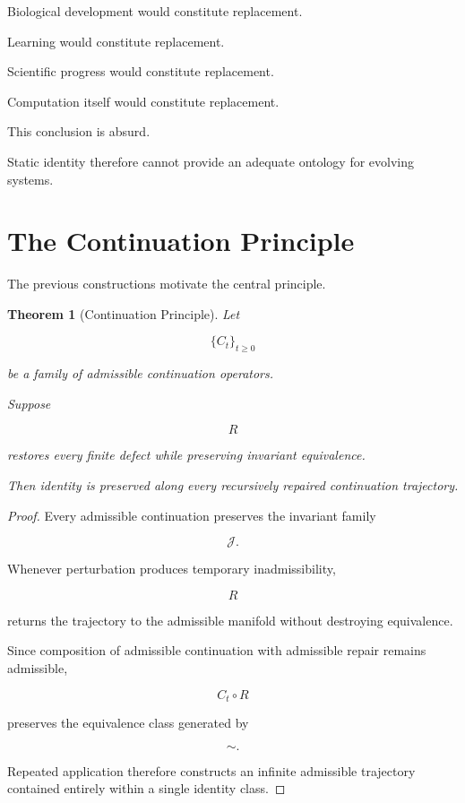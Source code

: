 \documentclass[11pt,oneside]{book}
\numberwithin{equation}{chapter}
\theoremstyle{definition}
\theoremstyle{plain}
\newtheorem{theorem}[definition]{Theorem}
\begin{document}
Biological development would constitute replacement.

Learning would constitute replacement.

Scientific progress would constitute replacement.

Computation itself would constitute replacement.

This conclusion is absurd.

Static identity therefore cannot provide an adequate ontology for evolving
systems.

\section{The Continuation Principle}

The previous constructions motivate the central principle.

\begin{theorem}[Continuation Principle]

Let

\[
\{C_t\}_{t\ge0}
\]

be a family of admissible continuation operators.

Suppose

\[
R
\]

restores every finite defect while preserving invariant equivalence.

Then identity is preserved along every recursively repaired continuation
trajectory.

\end{theorem}

\begin{proof}

Every admissible continuation preserves the invariant family

\[
\mathcal{J}.
\]

Whenever perturbation produces temporary inadmissibility,

\[
R
\]

returns the trajectory to the admissible manifold without destroying
equivalence.

Since composition of admissible continuation with admissible repair remains
admissible,

\[
C_t
\circ
R
\]

preserves the equivalence class generated by

\[
\sim.
\]

Repeated application therefore constructs an infinite admissible trajectory
contained entirely within a single identity class.

\end{proof}
\end{document}
